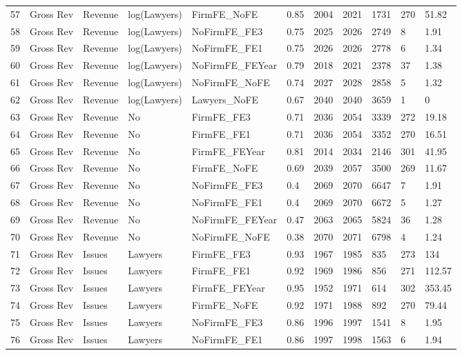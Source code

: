 \begin{table}[ht]
\begin{tabular}{rllllllllll}
  57 & Gross Rev & Revenue & log(Lawyers) & FirmFE\_NoFE & 0.85 & 2004 & 2021 & 1731 & 270 & 51.82 \\ 
  58 & Gross Rev & Revenue & log(Lawyers) & NoFirmFE\_FE3 & 0.75 & 2025 & 2026 & 2749 & 8 & 1.91 \\ 
  59 & Gross Rev & Revenue & log(Lawyers) & NoFirmFE\_FE1 & 0.75 & 2026 & 2026 & 2778 & 6 & 1.34 \\ 
  60 & Gross Rev & Revenue & log(Lawyers) & NoFirmFE\_FEYear & 0.79 & 2018 & 2021 & 2378 & 37 & 1.38 \\ 
  61 & Gross Rev & Revenue & log(Lawyers) & NoFirmFE\_NoFE & 0.74 & 2027 & 2028 & 2858 & 5 & 1.32 \\ 
  62 & Gross Rev & Revenue & log(Lawyers) & Lawyers\_NoFE & 0.67 & 2040 & 2040 & 3659 & 1 & 0 \\ 
  63 & Gross Rev & Revenue & No & FirmFE\_FE3 & 0.71 & 2036 & 2054 & 3339 & 272 & 19.18 \\ 
  64 & Gross Rev & Revenue & No & FirmFE\_FE1 & 0.71 & 2036 & 2054 & 3352 & 270 & 16.51 \\ 
  65 & Gross Rev & Revenue & No & FirmFE\_FEYear & 0.81 & 2014 & 2034 & 2146 & 301 & 41.95 \\ 
  66 & Gross Rev & Revenue & No & FirmFE\_NoFE & 0.69 & 2039 & 2057 & 3500 & 269 & 11.67 \\ 
  67 & Gross Rev & Revenue & No & NoFirmFE\_FE3 & 0.4 & 2069 & 2070 & 6647 & 7 & 1.91 \\ 
  68 & Gross Rev & Revenue & No & NoFirmFE\_FE1 & 0.4 & 2069 & 2070 & 6672 & 5 & 1.27 \\ 
  69 & Gross Rev & Revenue & No & NoFirmFE\_FEYear & 0.47 & 2063 & 2065 & 5824 & 36 & 1.28 \\ 
  70 & Gross Rev & Revenue & No & NoFirmFE\_NoFE & 0.38 & 2070 & 2071 & 6798 & 4 & 1.24 \\ 
  71 & Gross Rev & Issues & Lawyers & FirmFE\_FE3 & 0.93 & 1967 & 1985 & 835 & 273 & 134 \\ 
  72 & Gross Rev & Issues & Lawyers & FirmFE\_FE1 & 0.92 & 1969 & 1986 & 856 & 271 & 112.57 \\ 
  73 & Gross Rev & Issues & Lawyers & FirmFE\_FEYear & 0.95 & 1952 & 1971 & 614 & 302 & 353.45 \\ 
  74 & Gross Rev & Issues & Lawyers & FirmFE\_NoFE & 0.92 & 1971 & 1988 & 892 & 270 & 79.44 \\ 
  75 & Gross Rev & Issues & Lawyers & NoFirmFE\_FE3 & 0.86 & 1996 & 1997 & 1541 & 8 & 1.95 \\ 
  76 & Gross Rev & Issues & Lawyers & NoFirmFE\_FE1 & 0.86 & 1997 & 1998 & 1563 & 6 & 1.94 \\ 

\end{tabular}
\end{table}
